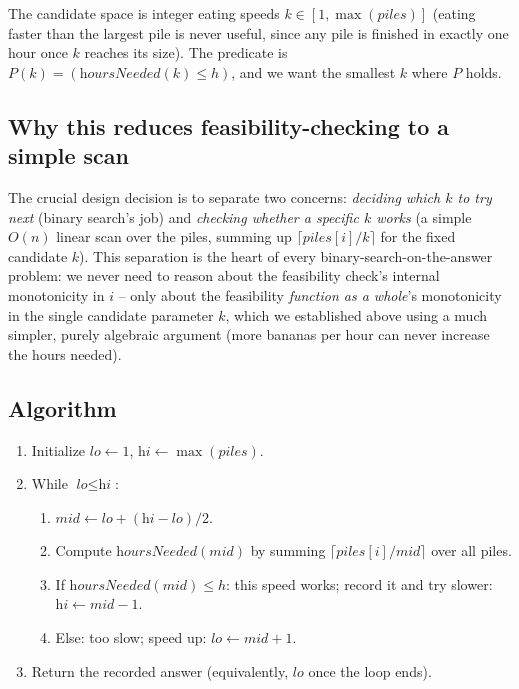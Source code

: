 \begin{ideabox}
The candidate space is integer eating speeds $k \in [1, \max(\textit{piles})]$
(eating faster than the largest pile is never useful, since any pile is
finished in exactly one hour once $k$ reaches its size). The predicate is
$P(k) = (\textit{hoursNeeded}(k) \le h)$, and we want the smallest $k$
where $P$ holds.
\end{ideabox}

\subsection*{Why this reduces feasibility-checking to a simple scan}

The crucial design decision is to separate two concerns: \emph{deciding
which $k$ to try next} (binary search's job) and \emph{checking whether a
specific $k$ works} (a simple $O(n)$ linear scan over the piles, summing
up $\lceil \textit{piles}[i]/k \rceil$ for the fixed candidate $k$). This
separation is the heart of every binary-search-on-the-answer problem: we
never need to reason about the feasibility check's internal monotonicity
in $i$ -- only about the feasibility \emph{function as a whole}'s
monotonicity in the single candidate parameter $k$, which we established
above using a much simpler, purely algebraic argument (more bananas per
hour can never increase the hours needed).

\subsection*{Algorithm}

\begin{enumerate}
  \item Initialize $\textit{lo} \gets 1$,
        $\textit{hi} \gets \max(\textit{piles})$.
  \item While $\textit{lo} \le \textit{hi}$:
  \begin{enumerate}
    \item $\textit{mid} \gets \textit{lo}+(\textit{hi}-\textit{lo})/2$.
    \item Compute $\textit{hoursNeeded}(\textit{mid})$ by summing
          $\lceil \textit{piles}[i] / \textit{mid} \rceil$ over all piles.
    \item If $\textit{hoursNeeded}(\textit{mid}) \le h$: this speed works;
          record it and try slower: $\textit{hi} \gets \textit{mid}-1$.
    \item Else: too slow; speed up: $\textit{lo} \gets \textit{mid}+1$.
  \end{enumerate}
  \item Return the recorded answer (equivalently, $\textit{lo}$ once the
        loop ends).
\end{enumerate}


